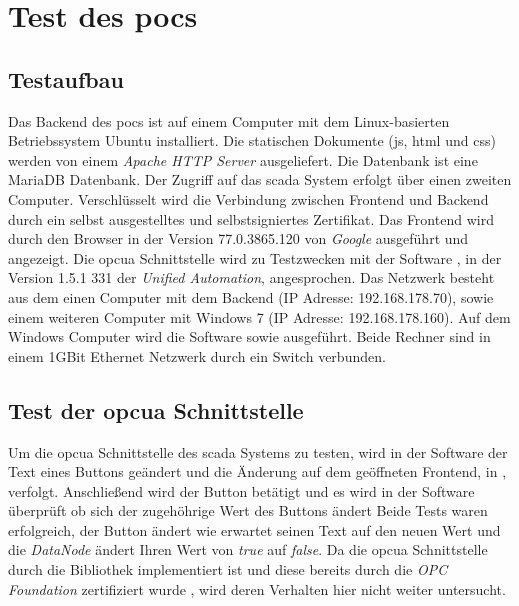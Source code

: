\section{Test des \acp{poc} }\label{sec:poc:test}
\subsection{Testaufbau}
Das Backend des \acp{poc} ist auf einem Computer mit dem Linux-basierten Betriebssystem Ubuntu installiert. 
Die statischen Dokumente (\ac{js}, \ac{html} und \ac{css}) werden von einem \emph{Apache HTTP Server} \citep{apache} ausgeliefert.
Die Datenbank ist eine MariaDB Datenbank.
Der Zugriff auf das \ac{scada} System erfolgt über einen zweiten Computer.
Verschlüsselt wird die Verbindung zwischen Frontend und Backend durch ein selbst ausgestelltes und selbstsigniertes Zertifikat.
Das Frontend wird durch den Browser  in der Version 77.0.3865.120 von \emph{Google} ausgeführt und angezeigt.
Die \ac{opcua} Schnittstelle wird zu Testzwecken mit der Software , in der Version 1.5.1 331 der \emph{Unified Automation}, angesprochen.
Das Netzwerk besteht aus dem einen Computer mit dem Backend (IP Adresse: 192.168.178.70), sowie einem weiteren Computer mit Windows 7 (IP Adresse: 192.168.178.160).
Auf dem Windows Computer wird die Software  sowie  ausgeführt.
Beide Rechner sind in einem 1GBit Ethernet Netzwerk durch ein Switch verbunden.

\subsection{Test der \acs{opcua} Schnittstelle}
Um die \ac{opcua} Schnittstelle des \ac{scada} Systems zu testen, 
wird in der Software  der Text eines Buttons geändert und die Änderung auf dem geöffneten Frontend, 
in , verfolgt.
Anschließend wird der Button betätigt und es wird in der Software  überprüft ob sich der zugehöhrige Wert des Buttons ändert
Beide Tests waren erfolgreich, der Button ändert wie erwartet seinen Text auf den neuen Wert und die \emph{DataNode} ändert Ihren Wert von \emph{true} auf \emph{false}.
Da die \ac{opcua} Schnittstelle durch die Bibliothek  implementiert ist und diese bereits durch die \emph{OPC Foundation} zertifiziert wurde \citep{cert62541}, wird deren Verhalten hier nicht weiter untersucht.

